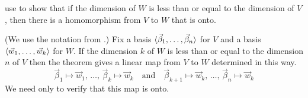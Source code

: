 \begin{exercises}
    use  to show that
    if the dimension of $W$ is 
    less than or equal to the dimension of $V$,
    then there is a homomorphism from $V$ to $W$ that is onto.
    \begin{answer}
      (We use the notation from .)
      Fix a basis $\langle\vec{\beta}_1,\dots,\vec{\beta}_n\rangle$ for $V$
      and a basis 
      $\langle\vec{w}_1,\ldots,\vec{w}_k\rangle$ for $W$.
      If the dimension $k$ of $W$ is less than or equal to the dimension $n$
      of $V$ 
      then the theorem gives a linear map from $V$ to $W$
      determined in this way.
      \begin{equation*}
        \vec{\beta}_1\mapsto\vec{w}_1,\,\dots,\,\vec{\beta}_k\mapsto\vec{w}_k
        \quad\text{and}\quad
        \vec{\beta}_{k+1}\mapsto\vec{w}_k,
           \,\dots,\,\vec{\beta}_n\mapsto\vec{w}_k
      \end{equation*}
      We need only to verify that this map is onto.


\end{answer}
\end{exercises}
